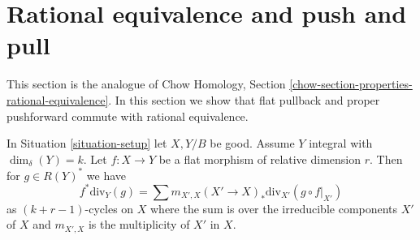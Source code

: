\section{Rational equivalence and push and pull}
\label{section-properties-rational-equivalence}

\noindent
This section is the analogue of
Chow Homology, Section \ref{chow-section-properties-rational-equivalence}.
In this section we show that flat pullback and proper pushforward
commute with rational equivalence.

\begin{lemma}
\label{lemma-prepare-flat-pullback-rational-equivalence}
In Situation \ref{situation-setup} let $X, Y/B$ be good.
Assume $Y$ integral with $\dim_\delta(Y) = k$.
Let $f : X \to Y$ be a flat morphism of
relative dimension $r$. Then for $g \in R(Y)^*$ we have
$$
f^*\text{div}_Y(g) =
\sum m_{X', X} (X' \to X)_*\text{div}_{X'}(g \circ f|_{X'})
$$
as $(k + r - 1)$-cycles on $X$ where the sum is over the irreducible
components $X'$ of $X$ and $m_{X', X}$ is the multiplicity of $X'$ in $X$.
\end{lemma}


